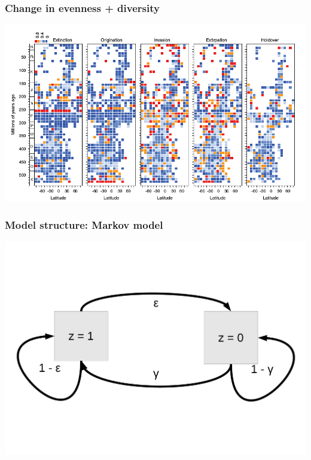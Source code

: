 \documentclass{beamer}
\begin{document}
\begin{frame}
  \frametitle{Change in evenness + diversity}
  \begin{center}
    \includegraphics[width=\textwidth,height=0.8\textheight,keepaspectratio=true]{figure/powell_2015}
  \end{center}

\end{frame}


\begin{frame}
  \frametitle{Model structure: Markov model}
  \begin{center}
    \includegraphics[width=\textwidth,height=0.8\textheight,keepaspectratio=true]{figure/mm_diagram}
  \end{center}
\end{frame}
\end{document}
